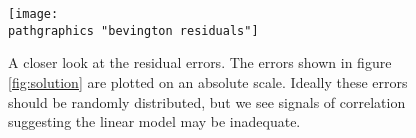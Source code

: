 \begin{figure}[t]
	\texttt{[image: \\pathgraphics "bevington residuals"]}
	\caption{A closer look at the residual errors. The errors shown in figure \eqref{fig:solution} are plotted on an absolute scale. Ideally these errors should be randomly distributed, but we see signals of correlation suggesting the linear model may be inadequate.}
	\label{fig:residuals}
\end{figure}

\endinput  %